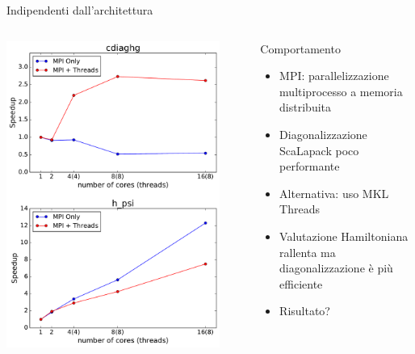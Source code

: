 \documentclass[8pt]{beamer}
\begin{document}
\begin{frame}{Indipendenti dall'architettura}
\begin{columns}[c]
{\begin{center}
{	\includegraphics[width=0.9\textwidth, height=0.85 \textheight]{beam_threads_subroutines_MPI_threads.pdf}	
	}
\end{center}
}

\begin{center}
\begin{overlayarea}{\linewidth}{\textheight}


	\begin{block}{Comportamento}
		\begin{itemize}
			\item<1-> MPI: parallelizzazione multiprocesso a memoria distribuita
			\item<2-> Diagonalizzazione ScaLapack poco performante
			\item<3-> Alternativa: uso MKL Threads
			\item<4-> Valutazione Hamiltoniana rallenta ma diagonalizzazione \`e pi\`u efficiente
			\item<5-> Risultato?
		\end{itemize}
	\end{block}

\end{overlayarea}
\end{center}

\end{columns}


\end{frame}
\end{document}
